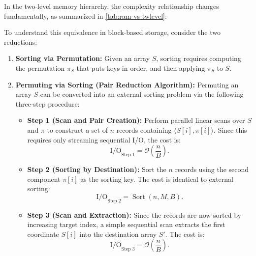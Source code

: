 In the two-level memory hierarchy, the complexity relationship changes fundamentally, as summarized in \autoref{tab:ram-vs-twlevel}:

\begin{table}[H]
  \centering
  \renewcommand{\arraystretch}{1.5}
  \caption{Asymptotic complexity comparison between RAM and External Memory models.}
  \label{tab:ram-vs-twlevel}
\end{table}

To understand this equivalence in block-based storage, consider the two reductions:

\begin{enumerate}
  \item \textbf{Sorting via Permutation:} Given an array $S$, sorting requires computing the permutation $\pi_S$ that puts keys in order, and then applying $\pi_S$ to $S$.
  \item \textbf{Permuting via Sorting (Pair Reduction Algorithm):}
  Permuting an array $S$ can be converted into an external sorting problem via the following three-step procedure:
  \begin{itemize}
    \item \textbf{Step 1 (Scan and Pair Creation):} Perform parallel linear scans over $S$ and $\pi$ to construct a set of $n$ records containing $\langle S[i], \pi[i] \rangle$. Since this requires only streaming sequential I/O, the cost is:
    \[
      \mathrm{I/O}_{\text{Step 1}} = \mathcal{O}\left(\frac{n}{B}\right).
    \]
    \item \textbf{Step 2 (Sorting by Destination):} Sort the $n$ records using the second component $\pi[i]$ as the sorting key. The cost is identical to external sorting:
    \[
      \mathrm{I/O}_{\text{Step 2}} = \operatorname{Sort}(n, M, B).
    \]
    \item \textbf{Step 3 (Scan and Extraction):} Since the records are now sorted by increasing target index, a simple sequential scan extracts the first coordinate $S[i]$ into the destination array $S'$. The cost is:
    \[
      \mathrm{I/O}_{\text{Step 3}} = \mathcal{O}\left(\frac{n}{B}\right).
    \]
  \end{itemize}
\end{enumerate}

